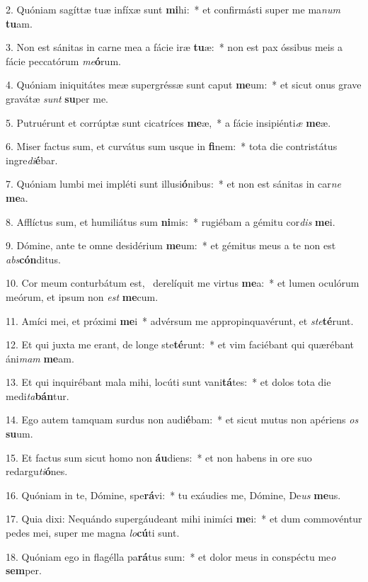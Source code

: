 2. Quóniam sagíttæ tuæ infíxæ sunt \textbf{mi}hi:~*  et confirmásti super me ma\textit{num} \textbf{tu}am.\

3. Non est sánitas in carne mea a fácie iræ \textbf{tu}æ:~*  non est pax óssibus meis a fácie peccatórum \textit{me}\textbf{ó}rum.\

4. Quóniam iniquitátes meæ supergréssæ sunt caput \textbf{me}um:~*  et sicut onus grave gravátæ \textit{sunt} \textbf{su}per me.\

5. Putruérunt et corrúptæ sunt cicatríces \textbf{me}æ,~*  a fácie insipiénti\textit{æ} \textbf{me}æ.\

6. Miser factus sum, et curvátus sum usque in \textbf{fi}nem:~*  tota die contristátus ingre\textit{di}\textbf{é}bar.\

7. Quóniam lumbi mei impléti sunt illusi\textbf{ó}nibus:~*  et non est sánitas in car\textit{ne} \textbf{me}a.\

8. Afflíctus sum, et humiliátus sum \textbf{ni}mis:~*  rugiébam a gémitu cor\textit{dis} \textbf{me}i.\

9. Dómine, ante te omne desidérium \textbf{me}um:~*  et gémitus meus a te non est \textit{abs}\textbf{cón}ditus.\

10. Cor meum conturbátum est, \dag\  derelíquit me virtus \textbf{me}a:~*  et lumen oculórum meórum, et ipsum non \textit{est} \textbf{me}cum.\

11. Amíci mei, et próximi \textbf{me}i~*  advérsum me appropinquavérunt, et \textit{ste}\textbf{té}runt.\

12. Et qui juxta me erant, de longe ste\textbf{té}runt:~*  et vim faciébant qui quærébant áni\textit{mam} \textbf{me}am.\

13. Et qui inquirébant mala mihi, locúti sunt vani\textbf{tá}tes:~*  et dolos tota die medi\textit{ta}\textbf{bán}tur.\

14. Ego autem tamquam surdus non audi\textbf{é}bam:~*  et sicut mutus non apériens \textit{os} \textbf{su}um.\

15. Et factus sum sicut homo non \textbf{áu}diens:~*  et non habens in ore suo redargu\textit{ti}\textbf{ó}nes.\

16. Quóniam in te, Dómine, spe\textbf{rá}vi:~*  tu exáudies me, Dómine, De\textit{us} \textbf{me}us.\

17. Quia dixi: Nequándo supergáudeant mihi inimíci \textbf{me}i:~*  et dum commovéntur pedes mei, super me magna \textit{lo}\textbf{cú}ti sunt.\

18. Quóniam ego in flagélla pa\textbf{rá}tus sum:~*  et dolor meus in conspéctu me\textit{o} \textbf{sem}per.\


